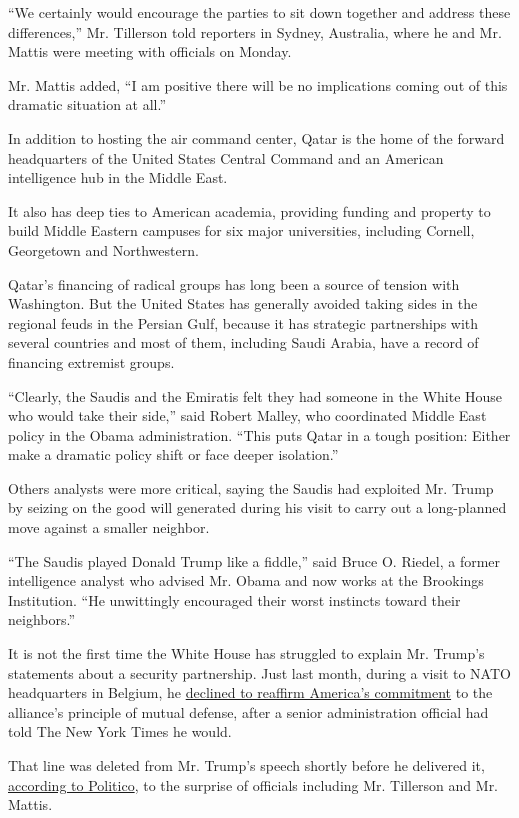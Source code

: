 ``We certainly would encourage the parties to sit down together and
address these differences,'' Mr. Tillerson told reporters in Sydney,
Australia, where he and Mr. Mattis were meeting with officials on
Monday.

Mr. Mattis added, ``I am positive there will be no implications coming
out of this dramatic situation at all.''

In addition to hosting the air command center, Qatar is the home of the
forward headquarters of the United States Central Command and an
American intelligence hub in the Middle East.

It also has deep ties to American academia, providing funding and
property to build Middle Eastern campuses for six major universities,
including Cornell, Georgetown and Northwestern.

Qatar's financing of radical groups has long been a source of tension
with Washington. But the United States has generally avoided taking
sides in the regional feuds in the Persian Gulf, because it has
strategic partnerships with several countries and most of them,
including Saudi Arabia, have a record of financing extremist groups.

``Clearly, the Saudis and the Emiratis felt they had someone in the
White House who would take their side,'' said Robert Malley, who
coordinated Middle East policy in the Obama administration. ``This puts
Qatar in a tough position: Either make a dramatic policy shift or face
deeper isolation.''

Others analysts were more critical, saying the Saudis had exploited Mr.
Trump by seizing on the good will generated during his visit to carry
out a long-planned move against a smaller neighbor.

``The Saudis played Donald Trump like a fiddle,'' said Bruce O. Riedel,
a former intelligence analyst who advised Mr. Obama and now works at the
Brookings Institution. ``He unwittingly encouraged their worst instincts
toward their neighbors.''

It is not the first time the White House has struggled to explain Mr.
Trump's statements about a security partnership. Just last month, during
a visit to NATO headquarters in Belgium, he
\href{https://www.nytimes.com/2017/05/25/world/europe/donald-trump-eu-nato.html}{declined
to reaffirm America's commitment} to the alliance's principle of mutual
defense, after a senior administration official had told The New York
Times he would.

That line was deleted from Mr. Trump's speech shortly before he
delivered it,
\href{http://www.politico.com/magazine/story/2017/06/05/trump-nato-speech-national-security-team-215227}{according
to Politico}, to the surprise of officials including Mr. Tillerson and
Mr. Mattis.

